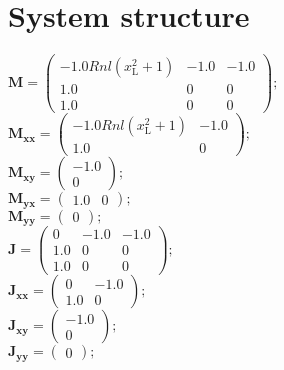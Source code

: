 \documentclass[11pt, oneside]{article}      %
\begin{document}
\section{System structure}
%

%
$ \mathbf{M} = \left(\begin{array}{ccc}- 1.0 Rnl \left(x_{\mathrm{L}}^{2} + 1\right) & -1.0 & -1.0\\1.0 & 0 & 0\\1.0 & 0 & 0\end{array}\right) ; $ 
%
\\
%
$ \mathbf{M_{xx}} = \left(\begin{array}{cc}- 1.0 Rnl \left(x_{\mathrm{L}}^{2} + 1\right) & -1.0\\1.0 & 0\end{array}\right) ; $ 
%
\\
%
$ \mathbf{M_{xy}} = \left(\begin{array}{c}-1.0\\0\end{array}\right) ; $ 
%
\\
%
$ \mathbf{M_{yx}} = \left(\begin{array}{cc}1.0 & 0\end{array}\right) ; $ 
%
\\
%
$ \mathbf{M_{yy}} = \left(\begin{array}{c}0\end{array}\right) ; $ 
%
\\
%

%
$ \mathbf{J} = \left(\begin{array}{ccc}0 & -1.0 & -1.0\\1.0 & 0 & 0\\1.0 & 0 & 0\end{array}\right) ; $ 
%
\\
%
$ \mathbf{J_{xx}} = \left(\begin{array}{cc}0 & -1.0\\1.0 & 0\end{array}\right) ; $ 
%
\\
%
$ \mathbf{J_{xy}} = \left(\begin{array}{c}-1.0\\0\end{array}\right) ; $ 
%
\\
%
$ \mathbf{J_{yy}} = \left(\begin{array}{c}0\end{array}\right) ; $ 
%
\\
%
\end{document}
